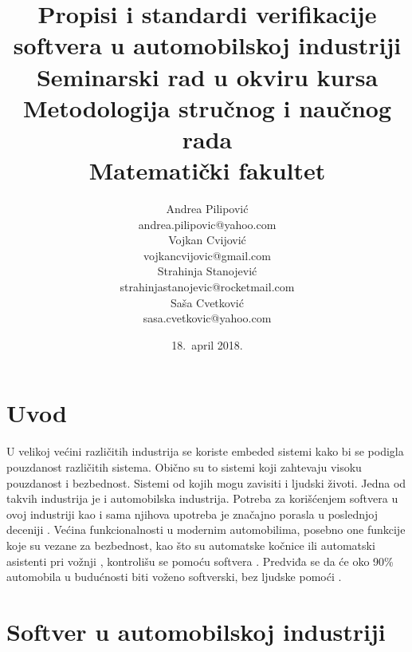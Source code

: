 \documentclass[a4paper]{article}
\begin{document}
\title{Propisi i standardi verifikacije softvera u automobilskoj industriji\\ \small{Seminarski rad u okviru kursa\\Metodologija stručnog i naučnog rada\\ Matematički fakultet}}

\author{
Andrea Pilipović\\ andrea.pilipovic@yahoo.com\\ 
Vojkan Cvijović\\ vojkancvijovic@gmail.com\\ 
Strahinja Stanojević\\ strahinjastanojevic@rocketmail.com\\ 
Saša Cvetković\\ sasa.cvetkovic@yahoo.com}

\date{18.~april 2018.}
\maketitle

\tableofcontents

\newpage

\section{Uvod}
\label{sec:uvod}

U velikoj većini različitih industrija se koriste embeded sistemi kako bi se podigla pouzdanost različitih sistema. Obično su to sistemi koji zahtevaju visoku pouzdanost i bezbednost. Sistemi od kojih mogu zavisiti i ljudski životi. Jedna od takvih industrija je i automobilska industrija. Potreba za korišćenjem softvera u ovoj industriji kao i sama njihova upotreba je značajno porasla u poslednjoj deceniji \cite{ref1} \cite{ref2}. Većina funkcionalnosti u modernim automobilima, posebno one funkcije koje su vezane za bezbednost, kao što su automatske kočnice ili automatski asistenti pri vožnji \cite{ref3}, kontrolišu se pomoću softvera \cite{ref4}. Predviđa se da će oko 90\% automobila u budućnosti biti voženo softverski, bez ljudske pomoći \cite{ref2}.


\section{Softver u automobilskoj industriji}
\label{sec:softer}
\end{document}
